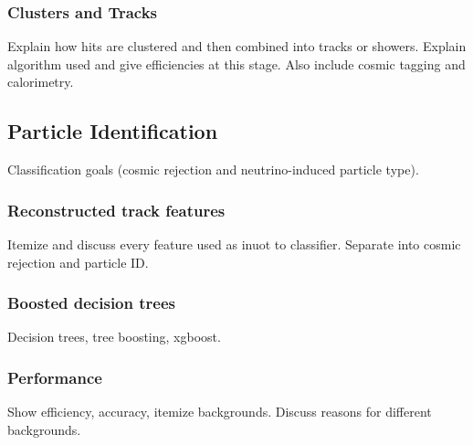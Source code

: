   \subsubsection{Clusters and Tracks}
    Explain how hits are clustered and then combined into tracks or showers.
    Explain algorithm used and give efficiencies at this stage. Also include
    cosmic tagging and calorimetry.

\subsection{Particle Identification}
  Classification goals (cosmic rejection and neutrino-induced particle type).
  \subsubsection{Reconstructed track features}
    Itemize and discuss every feature used as inuot to classifier.
    Separate into cosmic rejection and particle ID.
  \subsubsection{Boosted decision trees}
    Decision trees, tree boosting, xgboost.
  \subsubsection{Performance}
    Show efficiency, accuracy, itemize backgrounds.
    Discuss reasons for different backgrounds.


